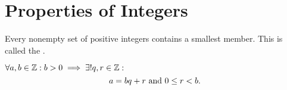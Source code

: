 \section{Properties of Integers}

\begin{mydef}
Every nonempty set of positive integers contains a smallest member. This is called the .
\end{mydef}

\begin{thm}
  \label{thm: Divison Algorithm}
  $\forall a,b \in \mathbb{Z}: b > 0 \implies \exists ! q,r \in \mathbb{Z}: $
  \begin{equation}
    a = bq + r $ and $ 0 \leq r < b.
  \end{equation}
\end{thm}
